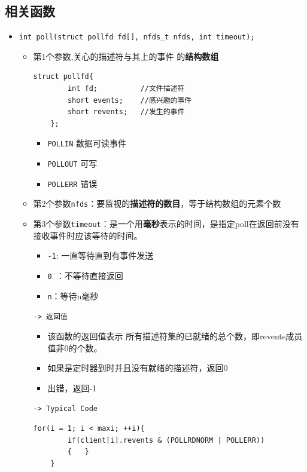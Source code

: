 \documentclass[UTF8,a4paper,8pt]{ctexbook}
\begin{document}
		\subsection{相关函数}
			\begin{itemize}
				\item \verb|int poll(struct pollfd fd[], nfds_t nfds, int timeout);|
					\begin{itemize}[itemindent = 1em]
						\item 第1个参数,关心的描述符与其上的事件 的\textbf{结构数组}
							\begin{lstlisting}[frame=L]
	struct pollfd{
		int fd;          //文件描述符
		short events;    //感兴趣的事件
		short revents;   //发生的事件
	};
							\end{lstlisting}
							\begin{itemize}
								\item \verb|POLLIN| 数据可读事件
								\item \verb|POLLOUT| 可写
								\item \verb|POLLERR| 错误
							\end{itemize}
						\item 第2个参数\verb|nfds|：要监视的\textbf{描述符的数目}，等于结构数组的元素个数
						\item 第3个参数\verb|timeout|：是一个用\textbf{毫秒}表示的时间，是指定poll在返回前没有接收事件时应该等待的时间。
							\begin{itemize}[itemindent = 1em]
								\item \verb|-1|: 一直等待直到有事件发送
								\item \verb|0 |：不等待直接返回
								\item \verb|n|：等待n毫秒
							\end{itemize}
						
						\verb|-> 返回值|
							\begin{itemize}
								\item 该函数的返回值表示 所有描述符集的已就绪的总个数，即revents成员值非0的个数。
								\item 如果是定时器到时并且没有就绪的描述符，返回0
								\item 出错，返回-1
								\end{itemize}
								
						\verb|-> Typical Code|
						\begin{lstlisting}[frame=L]
	for(i = 1; i < maxi; ++i){
		if(client[i].revents & (POLLRDNORM | POLLERR))
		{	}
	}
						\end{lstlisting}
					\end{itemize}
			\end{itemize}
\end{document}
